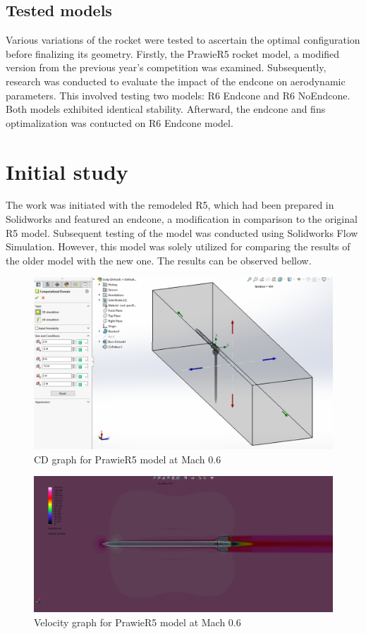 \documentclass{article}
\begin{document}
\subsection{Tested models}
Various variations of the rocket were tested to ascertain the optimal configuration before 
finalizing its geometry. Firstly, the PrawieR5 rocket model, a modified version from the previous year's competition 
was examined. Subsequently, research was conducted to evaluate the impact of the endcone on 
aerodynamic parameters. This involved testing two models: R6 Endcone and R6 NoEndcone. Both models exhibited identical stability. Afterward, the endcone and fins optimalization
was contucted on R6 Endcone model.


\newpage
\section{Initial study}
The work was initiated with the remodeled R5, which had been prepared in Solidworks 
and featured an endcone, a modification in comparison to the original R5 model. Subsequent 
testing of the model was conducted using Solidworks Flow Simulation. However, this model 
was solely utilized for comparing the results of the older model with the new one. The 
results can be observed bellow.

\begin{figure}[H]
    \centering
    \includegraphics[width=\textwidth]{../data/PrawieR5-Solid/ComputationalDomain.png}
    \caption{CD graph for PrawieR5 model at Mach 0.6}
\end{figure}

\begin{figure}[H]
    \centering
    \includegraphics[width=\textwidth]{../data/PrawieR5-Solid/PrawieR5-TR-Velocity-Mach06.png}
    \caption{Velocity graph for PrawieR5 model at Mach 0.6}
\end{figure}
\end{document}
